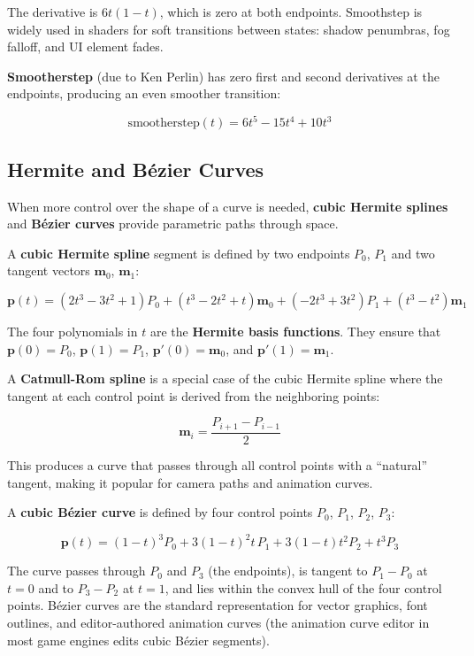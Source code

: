\documentclass[
  11pt,
  letterpaper,
  DIV=11,
  numbers=noendperiod,
  twoside,
  open=right]{scrreprt}
\begin{document}
The derivative is \(6t(1 - t)\), which is zero at both endpoints.
Smoothstep is widely used in shaders for soft transitions between
states: shadow penumbras, fog falloff, and UI element fades.

\textbf{Smootherstep} (due to Ken Perlin) has zero first and second
derivatives at the endpoints, producing an even smoother transition:

\[
\text{smootherstep}(t) = 6t^5 - 15t^4 + 10t^3
\]

\subsection{Hermite and Bézier
Curves}\label{hermite-and-buxe9zier-curves}

When more control over the shape of a curve is needed, \textbf{cubic
Hermite splines} and \textbf{Bézier curves} provide parametric paths
through space.

A \textbf{cubic Hermite spline} segment is defined by two endpoints
\(P_0\), \(P_1\) and two tangent vectors \(\mathbf{m}_0\),
\(\mathbf{m}_1\):

\[
\mathbf{p}(t) = (2t^3 - 3t^2 + 1) P_0 + (t^3 - 2t^2 + t) \mathbf{m}_0 + (-2t^3 + 3t^2) P_1 + (t^3 - t^2) \mathbf{m}_1
\]

The four polynomials in \(t\) are the \textbf{Hermite basis functions}.
They ensure that \(\mathbf{p}(0) = P_0\), \(\mathbf{p}(1) = P_1\),
\(\mathbf{p}'(0) = \mathbf{m}_0\), and
\(\mathbf{p}'(1) = \mathbf{m}_1\).

A \textbf{Catmull-Rom spline} is a special case of the cubic Hermite
spline where the tangent at each control point is derived from the
neighboring points:

\[
\mathbf{m}_i = \frac{P_{i+1} - P_{i-1}}{2}
\]

This produces a curve that passes through all control points with a
``natural'' tangent, making it popular for camera paths and animation
curves.

A \textbf{cubic Bézier curve} is defined by four control points \(P_0\),
\(P_1\), \(P_2\), \(P_3\):

\[
\mathbf{p}(t) = (1-t)^3 P_0 + 3(1-t)^2 t \, P_1 + 3(1-t) t^2 P_2 + t^3 P_3
\]

The curve passes through \(P_0\) and \(P_3\) (the endpoints), is tangent
to \(P_1 - P_0\) at \(t = 0\) and to \(P_3 - P_2\) at \(t = 1\), and
lies within the convex hull of the four control points. Bézier curves
are the standard representation for vector graphics, font outlines, and
editor-authored animation curves (the animation curve editor in most
game engines edits cubic Bézier segments).
\end{document}
